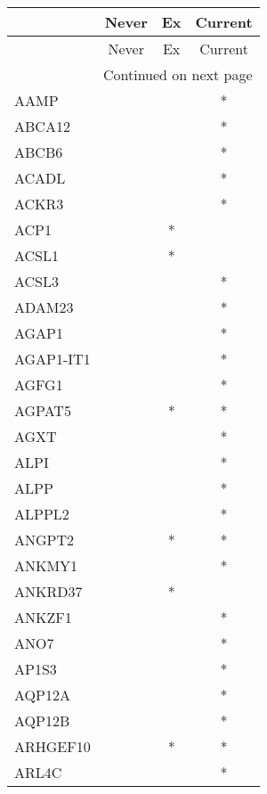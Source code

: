 \begin{longtable}{lccc}
\toprule
{} & Never & Ex & Current \\
\midrule
\endfirsthead

\toprule
{} & Never & Ex & Current \\
\midrule
\endhead
\midrule
\multicolumn{4}{r}{{Continued on next page}} \\
\midrule
\endfoot

\bottomrule
\endlastfoot
AAMP           &       &    &       * \\
ABCA12         &       &    &       * \\
ABCB6          &       &    &       * \\
ACADL          &       &    &       * \\
ACKR3          &       &    &       * \\
ACP1           &       &  * &         \\
ACSL1          &       &  * &         \\
ACSL3          &       &    &       * \\
ADAM23         &       &    &       * \\
AGAP1          &       &    &       * \\
AGAP1-IT1      &       &    &       * \\
AGFG1          &       &    &       * \\
AGPAT5         &       &  * &       * \\
AGXT           &       &    &       * \\
ALPI           &       &    &       * \\
ALPP           &       &    &       * \\
ALPPL2         &       &    &       * \\
ANGPT2         &       &  * &       * \\
ANKMY1         &       &    &       * \\
ANKRD37        &       &  * &         \\
ANKZF1         &       &    &       * \\
ANO7           &       &    &       * \\
AP1S3          &       &    &       * \\
AQP12A         &       &    &       * \\
AQP12B         &       &    &       * \\
ARHGEF10       &       &  * &       * \\
ARL4C          &       &    &       * \\

\end{longtable}
